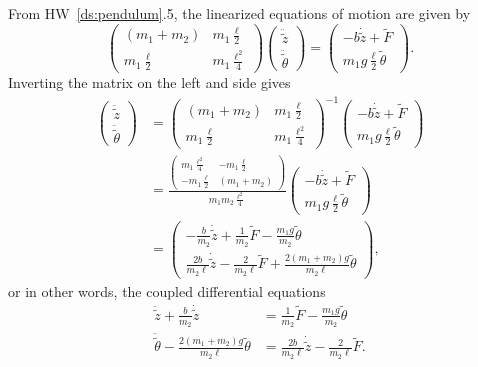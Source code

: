 
From HW~\ref{ds:pendulum}.5, the linearized equations of motion are given by
\[
\begin{pmatrix} (m_1+m_2) & m_1 \frac{\ell}{2} \\
m_1 \frac{\ell}{2} & m_1 \frac{\ell^2}{4} \end{pmatrix}\begin{pmatrix}
\ddot{\tilde{z}} \\ \ddot{\tilde{\theta}} \end{pmatrix}  =
\begin{pmatrix} -b\dot{\tilde{z}} + \tilde{F} 
	  \\
	m_1 g \frac{\ell}{2} \tilde{\theta} \end{pmatrix}.
\]
Inverting the matrix on the left and side gives
\begin{align*}
\begin{pmatrix}\ddot{\tilde{z}} \\ \ddot{\tilde{\theta}} \end{pmatrix}  
&= \begin{pmatrix} (m_1+m_2) & m_1 \frac{\ell}{2} \\
m_1 \frac{\ell}{2} & m_1 \frac{\ell^2}{4} \end{pmatrix}^{-1}
\begin{pmatrix} -b\dot{\tilde{z}} + \tilde{F} \\m_1 g \frac{\ell}{2} \tilde{\theta} \end{pmatrix} \\
&= \frac{\begin{pmatrix} m_1 \frac{\ell^2}{4} & -m_1 \frac{\ell}{2} \\
-m_1 \frac{\ell}{2} & (m_1+m_2) \end{pmatrix}}{m_1m_2\frac{\ell^2}{4}}
\begin{pmatrix} -b\dot{\tilde{z}} + \tilde{F} \\m_1 g \frac{\ell}{2} \tilde{\theta} \end{pmatrix} \\
&=\begin{pmatrix} -\frac{b}{m_2}\dot{\tilde{z}} + \frac{1}{m_2} \tilde{F} - \frac{m_1g}{m_2}\tilde{\theta} \\ \frac{2b}{m_2\ell}\dot{\tilde{z}}-\frac{2}{m_2\ell}\tilde{F}+\frac{2(m_1+m_2)g}{m_2\ell}\tilde{\theta} \end{pmatrix},
\end{align*}
or in other words, the coupled differential equations
\begin{align*}
\ddot{\tilde{z}} + \frac{b}{m_2}\dot{\tilde{z}} &=  \frac{1}{m_2} \tilde{F} - \frac{m_1g}{m_2}\tilde{\theta} \\
\ddot{\tilde{\theta}} - \frac{2(m_1+m_2)g}{m_2\ell}\tilde{\theta} &= \frac{2b}{m_2\ell}\dot{\tilde{z}}-\frac{2}{m_2\ell}\tilde{F}.
\end{align*}
